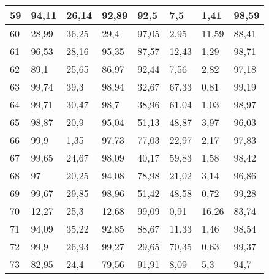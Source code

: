 \begin{longtable}[c]{|l|l|l|l|l|l|l|l|}
59              & 94,11        & 26,14        & 92,89       & 92,5          & 7,5           & 1,41          & 98,59         \\ \hline
60              & 28,99        & 36,25        & 29,4        & 97,05         & 2,95          & 11,59         & 88,41         \\ \hline
61              & 96,53        & 28,16        & 95,35       & 87,57         & 12,43         & 1,29          & 98,71         \\ \hline
62              & 89,1         & 25,65        & 86,97       & 92,44         & 7,56          & 2,82          & 97,18         \\ \hline
63              & 99,74        & 39,3         & 98,94       & 32,67         & 67,33         & 0,81          & 99,19         \\ \hline
64              & 99,71        & 30,47        & 98,7        & 38,96         & 61,04         & 1,03          & 98,97         \\ \hline
65              & 98,87        & 20,9         & 95,04       & 51,13         & 48,87         & 3,97          & 96,03         \\ \hline
66              & 99,9         & 1,35         & 97,73       & 77,03         & 22,97         & 2,17          & 97,83         \\ \hline
67              & 99,65        & 24,67        & 98,09       & 40,17         & 59,83         & 1,58          & 98,42         \\ \hline
68              & 97           & 20,25        & 94,08       & 78,98         & 21,02         & 3,14          & 96,86         \\ \hline
69              & 99,67        & 29,85        & 98,96       & 51,42         & 48,58         & 0,72          & 99,28         \\ \hline
70              & 12,27        & 25,3         & 12,68       & 99,09         & 0,91          & 16,26         & 83,74         \\ \hline
71              & 94,09        & 35,22        & 92,85       & 88,67         & 11,33         & 1,46          & 98,54         \\ \hline
72              & 99,9         & 26,93        & 99,27       & 29,65         & 70,35         & 0,63          & 99,37         \\ \hline
73              & 82,95        & 24,4         & 79,56       & 91,91         & 8,09          & 5,3           & 94,7          \\ \hline

\end{longtable}
